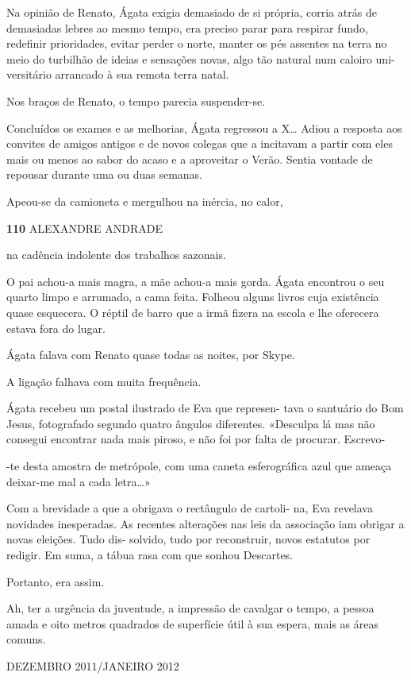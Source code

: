 Na opinião de Renato, Ágata exigia demasiado de si própria, corria atrás
de demasiadas lebres ao mesmo tempo, era preciso parar para respirar
fundo, redefinir prioridades, evitar perder o norte, manter os pés
assentes na terra no meio do turbilhão de ideias e sensações novas, algo
tão natural num caloiro uni- versitário arrancado à sua remota terra
natal.

Nos braços de Renato, o tempo parecia suspender-se.

Concluídos os exames e as melhorias, Ágata regressou a X\ldots{} Adiou a
resposta aos convites de amigos antigos e de novos colegas que a
incitavam a partir com eles mais ou menos ao sabor do acaso e a
aproveitar o Verão. Sentia vontade de repousar durante uma ou duas
semanas.

Apeou-se da camioneta e mergulhou na inércia, no calor,

\textbf{110 }ALEXANDRE ANDRADE

na cadência indolente dos trabalhos sazonais.

O pai achou-a mais magra, a mãe achou-a mais gorda. Ágata encontrou o
seu quarto limpo e arrumado, a cama feita. Folheou alguns livros cuja
existência quase esquecera. O réptil de barro que a irmã fizera na
escola e lhe oferecera estava fora do lugar.

Ágata falava com Renato quase todas as noites, por Skype.

A ligação falhava com muita frequência.

Ágata recebeu um postal ilustrado de Eva que represen- tava o santuário
do Bom Jesus, fotografado segundo quatro ângulos diferentes. «Desculpa
lá mas não consegui encontrar nada mais piroso, e não foi por falta de
procurar. Escrevo-

-te desta amostra de metrópole, com uma caneta esferográfica azul que
ameaça deixar-me mal a cada letra\ldots{}»

Com a brevidade a que a obrigava o rectângulo de cartoli- na, Eva
revelava novidades inesperadas. As recentes alterações nas leis da
associação iam obrigar a novas eleições. Tudo dis- solvido, tudo por
reconstruir, novos estatutos por redigir. Em suma, a tábua rasa com que
sonhou Descartes.

Portanto, era assim.

Ah, ter a urgência da juventude, a impressão de cavalgar o tempo, a
pessoa amada e oito metros quadrados de superfície útil à sua espera,
mais as áreas comuns.

DEZEMBRO 2011/JANEIRO 2012

